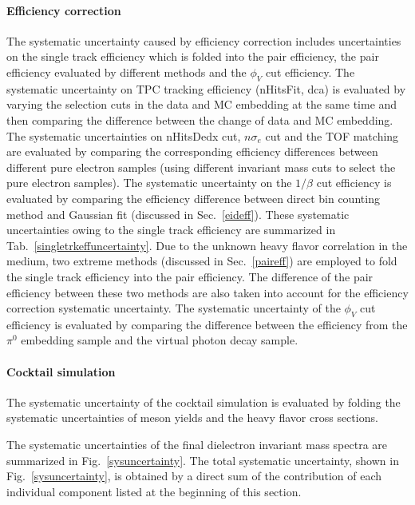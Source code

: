 \paragraph{Efficiency correction} The systematic uncertainty caused by efficiency correction includes uncertainties on the single track efficiency which is folded into the pair efficiency, the pair efficiency evaluated by different methods and the $\phi_{V}$ cut efficiency. The systematic uncertainty on TPC tracking efficiency (nHitsFit, dca) is evaluated by varying the selection cuts in the data and MC embedding at the same time and then comparing the difference between the change of data and MC embedding. The systematic uncertainties on nHitsDedx cut, $n\sigma_{e}$ cut and the TOF matching are evaluated by comparing the corresponding efficiency differences between different pure electron samples (using different invariant mass cuts to select the pure electron samples). The systematic uncertainty on the $1/\beta$ cut efficiency is evaluated by comparing the efficiency difference between direct bin counting method and Gaussian fit (discussed in Sec.~\ref{eideff}). These systematic uncertainties owing to the single track efficiency are summarized in Tab.~\ref{singletrkeffuncertainty}. Due to the unknown heavy flavor correlation in the medium, two extreme methods (discussed in Sec.~\ref{paireff}) are employed to fold the single track efficiency into the pair efficiency. The difference of the pair efficiency between these two methods are also taken into account for the efficiency correction systematic uncertainty. The systematic uncertainty of the $\phi_{V}$ cut efficiency is evaluated by comparing the difference between the efficiency from the $\pi^{0}$ embedding sample and the virtual photon decay sample.

\paragraph{Cocktail simulation}  The systematic uncertainty of the cocktail simulation is evaluated by folding the systematic uncertainties of meson yields and the heavy flavor cross sections.

 The systematic uncertainties of the final dielectron invariant mass spectra are summarized in Fig.~\ref{sysuncertainty}. The total systematic uncertainty, shown in Fig.~\ref{sysuncertainty}, is obtained by a direct sum of the contribution of each individual component listed at the beginning of this section. 

